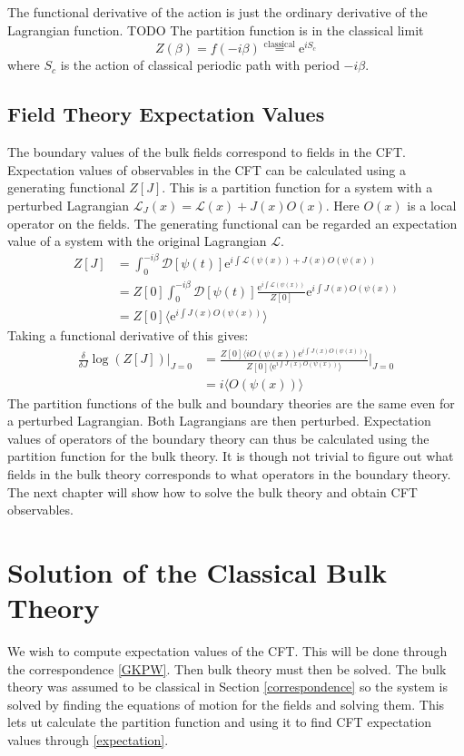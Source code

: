 \documentclass[12pt]{report}
\newcommand{\e}{\ensuremath{\mathrm{e}}}
\renewcommand{\L}{\ensuremath{\mathcal{L}}}
\renewcommand{\i}{\ensuremath{i}}
\begin{document}
The functional derivative of the action is just the ordinary derivative of the Lagrangian function. TODO
The partition function is in the classical limit
\begin{equation}
 Z(\beta)=f(-\i\beta)\stackrel{\mathrm{classical}}{=} \e^{i S_c}\label{classical}
\end{equation}
where $S_c$ is the action of classical periodic path with period $-\i\beta$.
\section{Field Theory Expectation Values}
The boundary values of the bulk fields correspond to fields in the CFT. Expectation values of observables in the CFT can be calculated using a generating functional $Z[J]$. This is a partition function for a system with a perturbed Lagrangian $\L_J(x)=\L(x)+J(x)O(x)$. Here $O(x)$ is a local operator on the fields. The generating functional can be regarded an expectation value of a system with the original Lagrangian $\L$.
\begin{equation}
\begin{split}
 Z[J]&=\int_0^{-\i\beta} \mathcal{D}[\psi(t)]\e^{\i \int \L(\psi(x))+J(x)O(\psi(x))}\\
&=Z[0]\int_0^{-\i\beta} \mathcal{D}[\psi(t)]\frac{\e^{\i\int \L(\psi(x))}}{Z[0]}\e^{\i\int J(x)O(\psi(x))}\\
&=Z[0]\langle\e^{\i\int J(x)O(\psi(x))}\rangle
\end{split}
\end{equation}
Taking a functional derivative of this gives:
\begin{equation}
\begin{split}
 \frac{\delta}{\delta J}\log(Z[J])|_{J=0}&=\frac{Z[0]\langle\i O(\psi(x))\e^{\i\int J(x)O(\psi(x))}\rangle}{  Z[0]\langle\e^{\i \int J(x)O(\psi(x))}\rangle }\big |_{J=0}\\
&=\i \langle O(\psi(x))\rangle\label{expectation}
\end{split}
\end{equation}
The partition functions of the bulk and boundary theories are the same even for a perturbed Lagrangian. Both Lagrangians are then perturbed. Expectation values of operators of the boundary theory can thus be calculated using the partition function for the bulk theory. It is though not trivial to figure out what fields in the bulk theory corresponds to what operators in the boundary theory. The next chapter will show how to solve the bulk theory and obtain CFT observables.
\chapter{Solution of the Classical Bulk Theory}
We wish to compute expectation values of the CFT. This will be done through the correspondence \eqref{GKPW}. Then bulk theory must then be solved. The bulk theory was assumed to be classical in Section \ref{correspondence} so the system is solved by finding the equations of motion for the fields and solving them. This lets ut calculate the partition function and using it to find CFT expectation values through \ref{expectation}.
\end{document}
